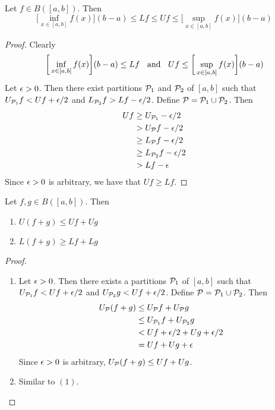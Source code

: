 \documentclass{book}
\begin{document}
	\begin{ex}  
		Let $f \in B([a,b])$. Then $$ \bigg[\inf_{x \in [a,b]} f(x) \bigg] (b-a) \leq Lf \leq Uf \leq \bigg[\sup_{x \in [a,b]} f(x) \bigg] (b-a)$$
	\end{ex}

	\begin{proof}
		Clearly $$\bigg[\inf_{x \in [a,b]} f(x) \bigg] (b-a) \leq Lf \hspace{.2cm } \text{ and } \hspace{.2cm } Uf \leq \bigg[\sup_{x \in [a,b]} f(x) \bigg] (b-a)$$ 
		Let $\epsilon >0$. Then there exist partitions $\mathcal{P}_1$ and $\mathcal{P}_2$ of $[a,b]$ such that $U_{\mathcal{P}_1} f < U f + \epsilon/2$ and $L_{\mathcal{P}_2} f > Lf - \epsilon/2 $. Define $\mathcal{P} = \mathcal{P}_1 \cup \mathcal{P}_2$. Then 
		\begin{align*}
			Uf 
			& \geq U_{\mathcal{P}_1}  - \epsilon/2 \\
			&> U_{\mathcal{P}} f - \epsilon/2 \\
			&\geq L_{\mathcal{P}} f -\epsilon/2 \\
			&\geq L_{\mathcal{P}_2} f -\epsilon/2 \\
			&> L f - \epsilon
		\end{align*} 
		Since $\epsilon >0$ is arbitrary, we have that $Uf \geq Lf$.
	\end{proof}

	\begin{ex}  
		Let $f, g \in B([a,b])$. Then 
		\begin{enumerate}
			\item $U(f+g) \leq U f + U g$
			\item $L(f+g) \geq L f + L g$
		\end{enumerate}
	\end{ex}

	\begin{proof}\
		\begin{enumerate}
			\item Let $\epsilon >0$. Then there exists a partitions $\mathcal{P}_1$ of $[a,b]$ such that $U_{\mathcal{P}_1} f < U f + \epsilon/2$ and $U_{\mathcal{P}_2} g < U f + \epsilon/2$. Define $\mathcal{P} = \mathcal{P}_1 \cup \mathcal{P}_2$. Then 
			\begin{align*}
				U_{\mathcal{P}}(f +g) 
				&\leq U_{\mathcal{P}} f + U_{\mathcal{P}} g \\
				&\leq U_{\mathcal{P}_1} f + U_{\mathcal{P}_2} g \\
				&< U f + \epsilon/2 +  U g + \epsilon/2 \\
				&= Uf + Ug + \epsilon
			\end{align*}
			Since $\epsilon >0$ is arbitrary, $U_{\mathcal{P}}(f +g)  \leq Uf + Ug$.
			\item Similar to $(1)$.
		\end{enumerate}
	\end{proof}
\end{document}
